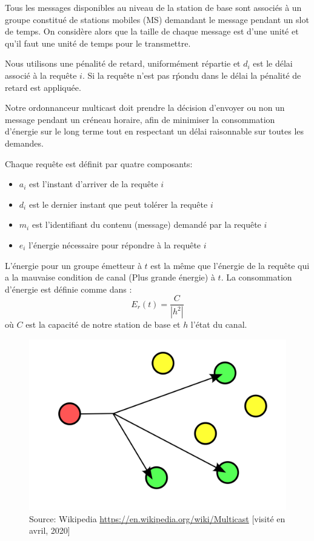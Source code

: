 \documentclass[runningheads]{llncs}
\begin{document}
Tous les messages disponibles au niveau de la station de base sont associés 
à un groupe constitué de stations mobiles (MS) demandant le message pendant 
un slot de temps.
On considère alors que la taille de chaque message est d'une unité et qu'il 
faut une unité de temps pour le transmettre.

Nous utilisons une pénalité de retard, uniformément répartie et 
$ d_i  $ est le d\'elai associé \`a la requête  $ i $. Si la requ\^ete 
n'est pas r\'pondu dans le délai la p\'enalit\'e de retard est appliqu\'ee.

Notre ordonnanceur multicast doit prendre la décision d'envoyer ou non 
un message pendant un créneau horaire, afin de minimiser la consommation 
d'énergie sur le long terme tout en respectant un délai raisonnable sur toutes les demandes.

Chaque requête est définit par quatre composants:
\begin{itemize}
    \item $a_i$ est l'instant d'arriver de la requête $i$
    \item $d_i$ est le dernier instant que peut tolérer la requête $i$
    \item $m_i$ est l'identifiant du contenu (message) demandé par la requête  $i$
    \item $e_i$ l'énergie nécessaire pour répondre à la requête $i$
\end{itemize} 

L'énergie pour un groupe émetteur à $ t $ est la même que l'énergie de la 
requête qui a la mauvaise condition de canal (Plus grande énergie) à $ t $.
La consommation d'énergie est définie comme dans \cite{huang2016}:
\begin{equation}
    E_r(t)  =  \frac {C} {| h ^ 2 |}  
\end{equation}
o\`u $C$ est la capacité  de notre station de base et $h$ l'état du canal.

\begin{figure}[H]
    \centering
    \includegraphics[scale=0.2]{multicast.png}
    \caption{Source: Wikipedia
    \url{https://en.wikipedia.org/wiki/Multicast}
    [visité en avril, 2020]}
\end{figure}
\end{document}
